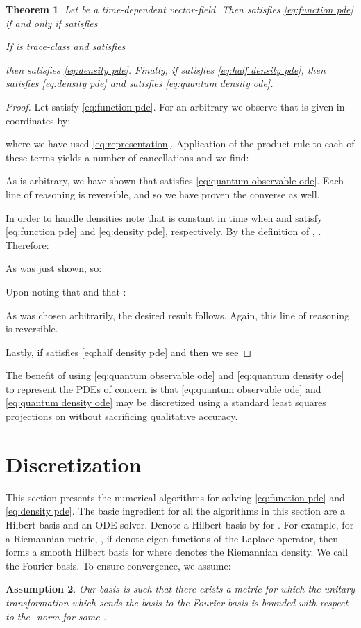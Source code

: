 \documentclass[final,leqno]{amsart}
\newtheorem{theorem}{Theorem}[section]
\newtheorem{ass}[theorem]{Assumption}
\begin{document}
\begin{theorem} \label{thm:quantize}
	Let  be a time-dependent vector-field.
	Then  satisfies \eqref{eq:function pde}
	if and only if  satisfies
	
	If  is trace-class and satisfies
	
	then  satisfies \eqref{eq:density pde}.
	Finally, if  satisfies \eqref{eq:half density pde}, then  satisfies \eqref{eq:density pde} and  satisfies \eqref{eq:quantum density ode}.
\end{theorem}

\begin{proof}
	Let  satisfy \eqref{eq:function pde}.
	For an arbitrary  we observe that  is given in coordinates by:
	
	where we have used \eqref{eq:representation}.  
	Application of the product rule to each of these terms yields a number of cancellations and we find:
	
	As  is arbitrary, we have shown that  satisfies \eqref{eq:quantum observable ode}.
	Each line of reasoning is reversible, and so we have proven the converse as well.
	
	In order to handle densities note that  is constant in time when  and  satisfy \eqref{eq:function pde} and \eqref{eq:density pde}, respectively.
	By the definition of , .
	Therefore:
	
	As was just shown,  so:
	
	Upon noting that  and that :
	
	As  was chosen arbitrarily, the desired result follows.
	Again, this line of reasoning is reversible.

	Lastly, if  satisfies \eqref{eq:half density pde} and  then we see
	
\end{proof}


The benefit of using \eqref{eq:quantum observable ode} and \eqref{eq:quantum density ode} to represent the PDEs of concern is that \eqref{eq:quantum observable ode} and \eqref{eq:quantum density ode} may be discretized using a standard least squares projections on  without sacrificing qualitative accuracy.




\section{Discretization} \label{sec:discretization}
This section presents the numerical algorithms for solving \eqref{eq:function pde} and \eqref{eq:density pde}.
The basic ingredient for all the algorithms in this section are a Hilbert basis and an ODE solver.
Denote a Hilbert basis by  for .
For example, for a Riemannian metric, , if  denote eigen-functions of the Laplace operator, then  forms a smooth Hilbert basis for  where  denotes the Riemannian density.  We call  the Fourier basis.
To ensure convergence, we assume:
\begin{ass} \label{ass:basis}
	Our basis  is such that there exists a metric  for which the unitary transformation which sends the basis  to the Fourier basis is bounded with respect to the -norm for some .
\end{ass}
\end{document}

